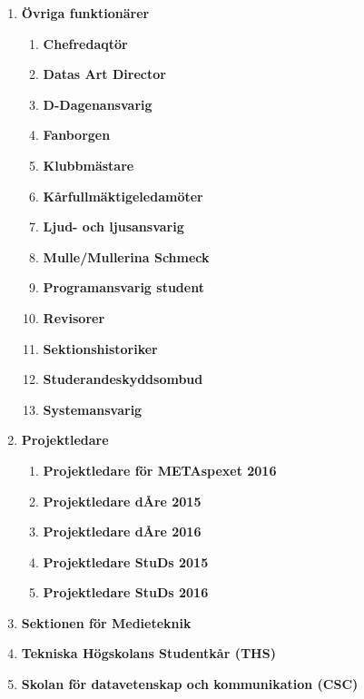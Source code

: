 \documentclass{protokoll}
\begin{document}
\begin{enumerate}
        \item \textbf{Övriga funktionärer}
      \begin{enumerate}
      	\item \textbf{Chefredaqtör}\\
      	\item \textbf{Datas Art Director}\\
      	\item \textbf{D-Dagenansvarig}\\
        \item \textbf{Fanborgen}\\
        \item \textbf{Klubbmästare}\\
        \item \textbf{Kårfullmäktigeledamöter}\\
        \item \textbf{Ljud- och ljusansvarig}\\
        \item \textbf{Mulle/Mullerina Schmeck}\\
        \item \textbf{Programansvarig student}\\
        \item \textbf{Revisorer}\\
        \item \textbf{Sektionshistoriker}\\
        \item \textbf{Studerandeskyddsombud}\\
        \item \textbf{Systemansvarig}\\
      \end{enumerate}
      
    \item \textbf{Projektledare}
      \begin{enumerate}
        \item \textbf{Projektledare för METAspexet 2016}\\
        \item \textbf{Projektledare dÅre 2015}\\
        \item \textbf{Projektledare dÅre 2016}\\
        \item \textbf{Projektledare StuDs 2015}\\
        \item \textbf{Projektledare StuDs 2016}\\
      \end{enumerate}

 
    \item \textbf{Sektionen för Medieteknik}\\
    \item \textbf{Tekniska Högskolans Studentkår (THS)}    \\
    \item \textbf{Skolan för datavetenskap och kommunikation (CSC)}\\
  \end{enumerate}
\end{document}
